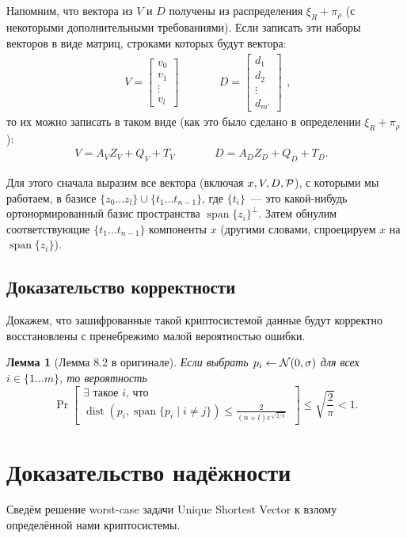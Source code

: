 \documentclass[oneside, a4paper]{article}
\theoremstyle{plain}
\newtheorem{lemma}[theorem]{Лемма}
\theoremstyle{definition}
\theoremstyle{remark}
\DeclareMathOperator{\Span}{span}
\DeclareMathOperator{\dist}{dist}
\newcommand\N{\ensuremath \mathcal N}
\newcommand\PP{\ensuremath \mathcal P}
\begin{document}
Напомним, что вектора из $V$ и $D$ получены из распределения $\xi_R + \pi_\rho$
(с некоторыми дополнительными требованиями). Если записать эти наборы векторов в
виде матриц, строками которых будут вектора:
\[
\begin{aligned}
  V = \begin{bmatrix}
    v_0 \\
    v_1 \\
    \vdots \\
    v_l
  \end{bmatrix}
  &
  \quad\quad
  &
  D = \begin{bmatrix}
    d_1 \\
    d_2 \\
    \vdots \\
    d_{m'}
  \end{bmatrix}
\end{aligned},
\]
то их можно записать в таком виде (как это было сделано в определении $\xi_R +
\pi_\rho$):
\[
\begin{aligned}
  V = A_V Z_V + Q_V + T_V &
  \quad\quad &
  D = A_D Z_D + Q_D + T_D. &
\end{aligned}
\]

Для этого сначала выразим все вектора (включая $x, V, D, \PP$), с которыми
мы работаем, в базисе $\{ z_0 \dots z_l \} \cup \{t_1 \dots t_{n-1}\}$, где
$\{t_i\}$~--- это какой-нибудь ортонормированный базис пространства $\Span
\{z_i\}^\bot$. Затем обнулим соответствующие $\{t_1 \dots t_{n-1}\}$ компоненты
$x$ (другими словами, спроецируем $x$ на $\Span \{z_i\}$).

\subsection{Доказательство корректности}
\label{sec:corr_proof}
Докажем, что зашифрованные такой криптосистемой данные будут корректно
восстановлены с пренебрежимо малой вероятностью ошибки.

\begin{lemma}[Лемма 8.2 в оригинале]
Если выбрать $p_i \gets \N(0, \sigma)$ для всех $i \in \{1 \dots m\}$, то
вероятность
\[
  \Pr \left[
  \substack{
  \displaystyle
  \text{$\exists$ такое $i$, что} \\
  \displaystyle
  \dist(p_i, \Span \{p_i \mid i \neq j\}) \leq \frac{2}{(n+l) e^{\sqrt{2/\pi}}}\
  }
  \right]
  \leq \sqrt{\frac 2 \pi} < 1.
\]
\end{lemma}


\section{Доказательство надёжности}
Сведём решение \foreignlanguage{english}{worst-case} задачи
\foreignlanguage{english}{Unique Shortest Vector} к взлому определённой нами
криптосистемы.
\end{document}
